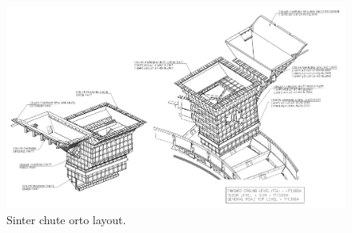 \begin{figure}[!htb]
\centering
\includegraphics[width=.80\columnwidth]{images/057sinterChuteOrtoLayout}
\caption[Sinter chute orto layout]{Sinter chute orto layout.}
\label{fig:057sinterChuteOrtoLayout}
\end{figure}